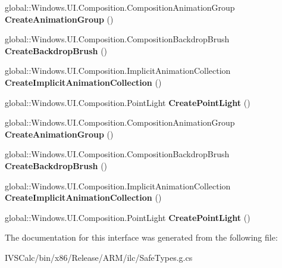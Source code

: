 \begin{DoxyCompactItemize}
\item 
\mbox{\label{interface_windows_1_1_u_i_1_1_composition_1_1_i_compositor2_a614654ecc2c1a3a0a9f0535586ebd659}} 
global\+::\+Windows.\+U\+I.\+Composition.\+Composition\+Animation\+Group {\bfseries Create\+Animation\+Group} ()
\item 
\mbox{\label{interface_windows_1_1_u_i_1_1_composition_1_1_i_compositor2_a61d8976607a1d3faed1024dadc930f51}} 
global\+::\+Windows.\+U\+I.\+Composition.\+Composition\+Backdrop\+Brush {\bfseries Create\+Backdrop\+Brush} ()
\item 
\mbox{\label{interface_windows_1_1_u_i_1_1_composition_1_1_i_compositor2_aac0cda04e2ab2c9d4a7a2c56f5a5cc70}} 
global\+::\+Windows.\+U\+I.\+Composition.\+Implicit\+Animation\+Collection {\bfseries Create\+Implicit\+Animation\+Collection} ()
\item 
\mbox{\label{interface_windows_1_1_u_i_1_1_composition_1_1_i_compositor2_af9017b48335a947750d1075cf206c777}} 
global\+::\+Windows.\+U\+I.\+Composition.\+Point\+Light {\bfseries Create\+Point\+Light} ()
\item 
\mbox{\label{interface_windows_1_1_u_i_1_1_composition_1_1_i_compositor2_a614654ecc2c1a3a0a9f0535586ebd659}} 
global\+::\+Windows.\+U\+I.\+Composition.\+Composition\+Animation\+Group {\bfseries Create\+Animation\+Group} ()
\item 
\mbox{\label{interface_windows_1_1_u_i_1_1_composition_1_1_i_compositor2_a61d8976607a1d3faed1024dadc930f51}} 
global\+::\+Windows.\+U\+I.\+Composition.\+Composition\+Backdrop\+Brush {\bfseries Create\+Backdrop\+Brush} ()
\item 
\mbox{\label{interface_windows_1_1_u_i_1_1_composition_1_1_i_compositor2_aac0cda04e2ab2c9d4a7a2c56f5a5cc70}} 
global\+::\+Windows.\+U\+I.\+Composition.\+Implicit\+Animation\+Collection {\bfseries Create\+Implicit\+Animation\+Collection} ()
\item 
\mbox{\label{interface_windows_1_1_u_i_1_1_composition_1_1_i_compositor2_af9017b48335a947750d1075cf206c777}} 
global\+::\+Windows.\+U\+I.\+Composition.\+Point\+Light {\bfseries Create\+Point\+Light} ()
\end{DoxyCompactItemize}


The documentation for this interface was generated from the following file\+:\begin{DoxyCompactItemize}
\item 
I\+V\+S\+Calc/bin/x86/\+Release/\+A\+R\+M/ilc/Safe\+Types.\+g.\+cs\end{DoxyCompactItemize}

